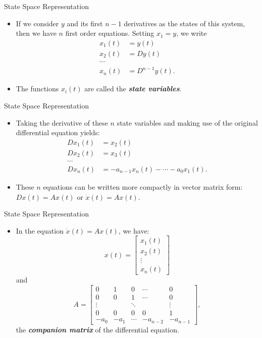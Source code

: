 \begin{frame}
State Space Representation
 \begin{itemize}
 \item If we consider $y$ and its first $n-1$ derivatives as the
 states of this system, then we have $n$ first order equations.
 Setting $x_1=y$, we write
\begin{align*}
  x_1(t) & = y(t) \\
  x_2(t) & = Dy(t) \\
    \cdots \\
  x_n(t) & = D^{n-1}y(t).
\end{align*}
\item The functions $x_i(t)$ are called the \textit{\textbf{state variables}}.
\end{itemize}
\end{frame}
\begin{frame}
State Space Representation
 \begin{itemize}
 \item Taking the derivative of these $n$ state variables and making use of the
 original differential equation yields:
\begin{align*}
  Dx_1(t) & = x_2(t) \\
  Dx_2(t) & = x_3(t) \\
    \cdots \\
  Dx_n(t) & =-a_{n-1}x_n(t)-\cdots - a_0x_1(t).
\end{align*}
 \item  These $n$ equations can be written more compactly in vector matrix
 form:  $Dx(t)=Ax(t)$ or $\dot{x}(t)=Ax(t)$.
\end{itemize}
\end{frame}
\begin{frame}
State Space Representation
 \begin{itemize}
 \item In the equation $\dot{x}(t)=Ax(t)$, we have:
 \[x(t)=\begin{bmatrix}x_1(t)\\x_2(t)\\\vdots \\
 x_n(t)\end{bmatrix}\]
 and
 \[A=\begin{bmatrix}
 0 & 1 & 0 &\cdots & 0\\
 0 & 0 & 1 & \cdots & 0\\
 \vdots & & \ddots & & \vdots \\
 0 & 0  & 0 & 0 & 1\\
 -a_{0} &-a_{1} & \cdots & -a_{n-2} & -a_{n-1}
 \end{bmatrix},\]
 the \textit{\textbf{companion matrix}} of the differential
 equation.
\end{itemize}
\end{frame}
